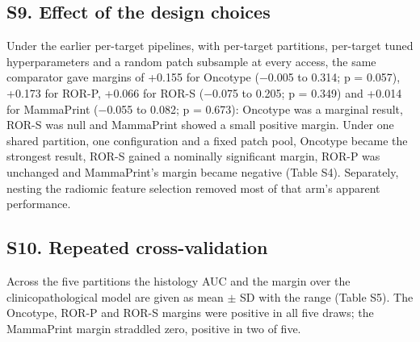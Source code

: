 \documentclass[11pt,a4paper]{article}
\begin{document}
\subsection{S9. Effect of the design choices}
Under the earlier per-target pipelines, with per-target partitions, per-target tuned hyperparameters and a random patch subsample at every access, the same comparator gave margins of +0.155 for Oncotype ($-$0.005 to 0.314; p = 0.057), +0.173 for ROR-P, +0.066 for ROR-S ($-$0.075 to 0.205; p = 0.349) and +0.014 for MammaPrint ($-$0.055 to 0.082; p = 0.673): Oncotype was a marginal result, ROR-S was null and MammaPrint showed a small positive margin. Under one shared partition, one configuration and a fixed patch pool, Oncotype became the strongest result, ROR-S gained a nominally significant margin, ROR-P was unchanged and MammaPrint's margin became negative (Table S4). Separately, nesting the radiomic feature selection removed most of that arm's apparent performance.

\subsection{S10. Repeated cross-validation}
Across the five partitions the histology AUC and the margin over the clinicopathological model are given as mean $\pm$ SD with the range (Table S5). The Oncotype, ROR-P and ROR-S margins were positive in all five draws; the MammaPrint margin straddled zero, positive in two of five.

\clearpage
\end{document}
